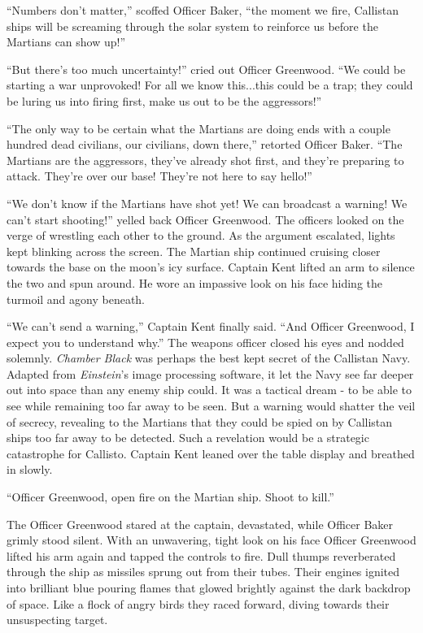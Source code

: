 \documentclass[12pt]{article} %
\begin{document}
``Numbers don't matter,'' scoffed Officer Baker, ``the moment we fire, Callistan ships will be screaming through the solar system to reinforce us before the Martians can show up!''

``But there's too much uncertainty!'' cried out Officer Greenwood. ``We could be starting a war unprovoked! For all we know this...this could be a trap; they could be luring us into firing first, make us out to be the aggressors!''

``The only way to be certain what the Martians are doing ends with a couple hundred dead civilians, our civilians, down there,'' retorted Officer Baker. ``The Martians are the aggressors, they've already shot first, and they're preparing to attack. They're over our base! They're not here to say hello!''

``We don't know if the Martians have shot yet! We can broadcast a warning! We can't start shooting!'' yelled back Officer Greenwood. The officers looked on the verge of wrestling each other to the ground. As the argument escalated, lights kept blinking across the screen. The Martian ship continued cruising closer towards the base on the moon's icy surface. Captain Kent lifted an arm to silence the two and spun around. He wore an impassive look on his face hiding the turmoil and agony beneath.

``We can't send a warning,'' Captain Kent finally said. ``And Officer Greenwood, I expect you to understand why.'' The weapons officer closed his eyes and nodded solemnly. \textit{Chamber Black} was perhaps the best kept secret of the Callistan Navy. Adapted from \textit{Einstein}'s image processing software, it let the Navy see far deeper out into space than any enemy ship could. It was a tactical dream - to be able to see while remaining too far away to be seen. But a warning would shatter the veil of secrecy, revealing to the Martians that they could be spied on by Callistan ships too far away to be detected. Such a revelation would be a strategic catastrophe for Callisto. Captain Kent leaned over the table display and breathed in slowly.

``Officer Greenwood, open fire on the Martian ship. Shoot to kill.''

The Officer Greenwood stared at the captain, devastated, while Officer Baker grimly stood silent. With an unwavering, tight look on his face Officer Greenwood lifted his arm again and tapped the controls to fire. Dull thumps reverberated through the ship as missiles sprung out from their tubes. Their engines ignited into brilliant blue pouring flames that glowed brightly against the dark backdrop of space. Like a flock of angry birds they raced forward, diving towards their unsuspecting target.
\end{document}
